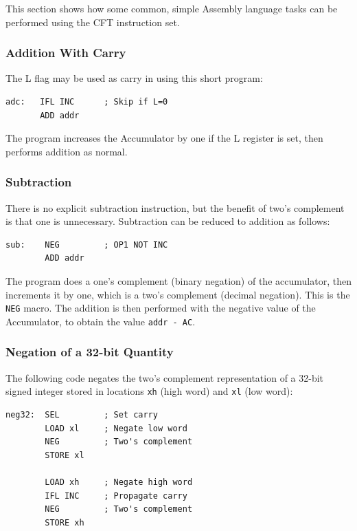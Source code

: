 \documentclass[11pt,a4paper,twocolumns]{article}
\newcommand\register[1]{\textsf{#1}}
\newcommand\Lreg{\register{L}}
\begin{document}
This section shows how some common, simple Assembly language tasks can
be performed using the CFT instruction set.

\subsubsection{Addition With Carry}

The \Lreg{} flag may be used as carry in using this short program:
\begin{verbatim}
adc:   IFL INC      ; Skip if L=0
       ADD addr
\end{verbatim}

The program increases the Accumulator by one if the \Lreg{} register is set,
then performs addition as normal.

\subsubsection{Subtraction}

There is no explicit subtraction instruction, but the benefit of two's
complement is that one is unnecessary. Subtraction can be reduced to
addition as follows:

\begin{verbatim}
sub:    NEG         ; OP1 NOT INC
        ADD addr
\end{verbatim}

The program does a one's complement (binary negation) of the
accumulator, then increments it by one, which is a two's complement
(decimal negation). This is the {\tt NEG} macro. The addition is then
performed with the negative value of the Accumulator, to obtain the
value {\tt addr - AC}.

\subsubsection{Negation of a 32-bit Quantity}

The following code negates the two's complement representation of a
32-bit signed integer stored in locations {\tt xh} (high word) and
{\tt xl} (low word):

\begin{verbatim}
neg32:  SEL         ; Set carry
        LOAD xl     ; Negate low word
        NEG         ; Two's complement
        STORE xl

        LOAD xh     ; Negate high word
        IFL INC     ; Propagate carry
        NEG         ; Two's complement
        STORE xh
\end{verbatim}
\end{document}
